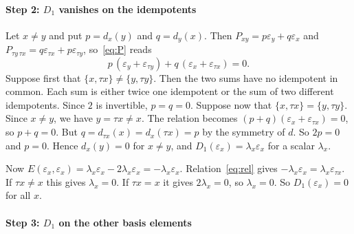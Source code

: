 \documentclass[]{interact}
\theoremstyle{plain}
\theoremstyle{definition}
\theoremstyle{remark}
\begin{document}
\paragraph*{Step 2: $D_1$ vanishes on the idempotents}

Let $x \ne y$ and put $p = d_x(y)$ and $q = d_y(x)$.
Then $P_{xy} = p\varepsilon_y + q\varepsilon_x$ and $P_{\tau y\,\tau x} = q\varepsilon_{\tau x} + p\varepsilon_{\tau y}$, so~\eqref{eq:P} reads
\[
p\,(\varepsilon_y + \varepsilon_{\tau y}) + q\,(\varepsilon_x + \varepsilon_{\tau x}) = 0.
\]
Suppose first that $\{x,\tau x\} \ne \{y,\tau y\}$.
Then the two sums have no idempotent in common.
Each sum is either twice one idempotent or the sum of two different idempotents. %
Since $2$ is invertible, $p = q = 0$.
Suppose now that $\{x,\tau x\} = \{y,\tau y\}$.
Since $x \ne y$, we have $y = \tau x \ne x$.
The relation becomes $(p + q)(\varepsilon_x + \varepsilon_{\tau x}) = 0$, so $p + q = 0$.
But $q = d_{\tau x}(x) = d_x(\tau x) = p$ by the symmetry of $d$.
So $2p = 0$ and $p = 0$.
Hence $d_x(y) = 0$ for $x \ne y$, and $D_1(\varepsilon_x) = \lambda_x\varepsilon_x$ for a scalar $\lambda_x$.

Now $E(\varepsilon_x,\varepsilon_x) = \lambda_x\varepsilon_x - 2\lambda_x\varepsilon_x = -\lambda_x\varepsilon_x$.
Relation~\eqref{eq:rel} gives $-\lambda_x\varepsilon_x = \lambda_x\varepsilon_{\tau x}$.
If $\tau x \ne x$ this gives $\lambda_x = 0$.
If $\tau x = x$ it gives $2\lambda_x = 0$, so $\lambda_x = 0$.
So $D_1(\varepsilon_x) = 0$ for all $x$.

\paragraph*{Step 3: $D_1$ on the other basis elements}
\end{document}
